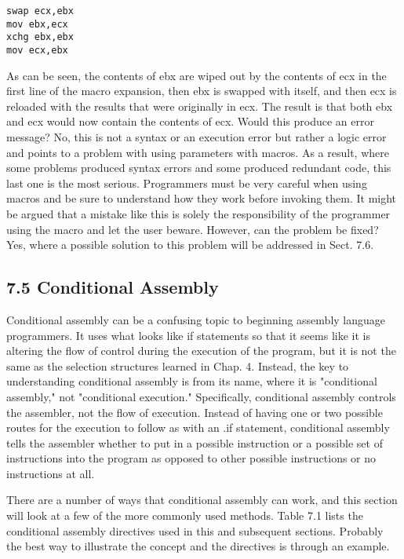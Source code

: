 \documentclass[10pt]{article}
\begin{document}
\begin{verbatim}
swap ecx,ebx
mov ebx,ecx
xchg ebx,ebx
mov ecx,ebx
\end{verbatim}

As can be seen, the contents of ebx are wiped out by the contents of ecx in the first line of the macro expansion, then ebx is swapped with itself, and then ecx is reloaded with the results that were originally in ecx. The result is that both ebx and ecx would now contain the contents of ecx. Would this produce an error message? No, this is not a syntax or an execution error but rather a logic error and points to a problem with using parameters with macros. As a result, where some problems produced syntax errors and some produced redundant code, this last one is the most serious. Programmers must be very careful when using macros and be sure to understand how they work before invoking them. It might be argued that a mistake like this is solely the responsibility of the programmer using the macro and let the user beware. However, can the problem be fixed? Yes, where a possible solution to this problem will be addressed in Sect. 7.6.

\subsection*{7.5 Conditional Assembly}
Conditional assembly can be a confusing topic to beginning assembly language programmers. It uses what looks like if statements so that it seems like it is altering the flow of control during the execution of the program, but it is not the same as the selection structures learned in Chap. 4. Instead, the key to understanding conditional assembly is from its name, where it is "conditional assembly," not "conditional execution." Specifically, conditional assembly controls the assembler, not the flow of execution. Instead of having one or two possible routes for the execution to follow as with an .if statement, conditional assembly tells the assembler whether to put in a possible instruction or a possible set of instructions into the program as opposed to other possible instructions or no instructions at all.

There are a number of ways that conditional assembly can work, and this section will look at a few of the more commonly used methods. Table 7.1 lists the conditional assembly directives used in this and subsequent sections. Probably the best way to illustrate the concept and the directives is through an example.
\end{document}
